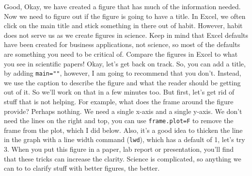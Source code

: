 \documentclass{tufte-handout}\usepackage[]{graphicx}\usepackage[]{xcolor}
\begin{document}
Good, Okay, we have created a figure that has much of the information needed. Now we need to figure out if the figure is going to have a title. In Excel, we often click on the main title and stick something in there out of habit. However, habit does not serve us as we create figures in science. Keep in mind that Excel defaults have been created for business applications, not science, so most of the defaults are something you need to be critical of. Compare the figures in Excel to what you see in scientific papers!  Okay, let's get back on track. So, you can add a title, by adding \texttt{main=""}, however, I am going to recommend that you don't. Instead, we use the caption to describe the figure and what the reader should be getting out of it.  So we'll work on that in a few minutes too. But first, let's get rid of stuff that is not helping. For example, what does the frame around the figure provide? Perhaps nothing.  We need a single x-axis and a single y-axis.  We don't need the lines on the right and top, you can use \texttt{frame.plot=F} to remove the frame from the plot, which I did below.  Also, it's a good idea to thicken the line in the graph with a line width command (\texttt{lwd}), which has a default of 1, let's try 3. When you put this figure in a paper, lab report or presentation, you'll find that these tricks can increase the clarity. Science is complicated, so anything we can to to clarify stuff with better figures, the better.
\end{document}
